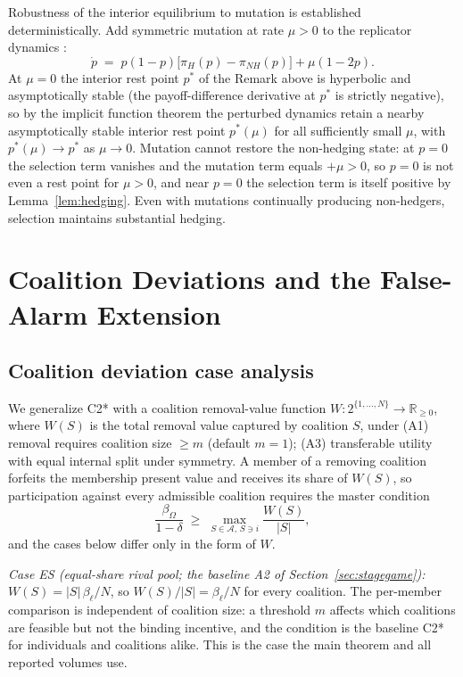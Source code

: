 \documentclass[manuscript,screen,review]{jair}
\begin{document}
Robustness of the interior equilibrium to mutation is established deterministically. Add symmetric mutation at rate $\mu > 0$ to the replicator dynamics \cite{nowak.2006,sandholm.2010}:
\begin{equation*}
\dot p \;=\; p(1-p)\bigl[\pi_H(p)-\pi_{NH}(p)\bigr] + \mu(1-2p).
\end{equation*}
At $\mu = 0$ the interior rest point $p^*$ of the Remark above is hyperbolic and asymptotically stable (the payoff-difference derivative at $p^*$ is strictly negative), so by the implicit function theorem the perturbed dynamics retain a nearby asymptotically stable interior rest point $p^*(\mu)$ for all sufficiently small $\mu$, with $p^*(\mu) \to p^*$ as $\mu \to 0$. Mutation cannot restore the non-hedging state: at $p = 0$ the selection term vanishes and the mutation term equals $+\mu > 0$, so $p = 0$ is not even a rest point for $\mu > 0$, and near $p = 0$ the selection term is itself positive by Lemma~\ref{lem:hedging}. Even with mutations continually producing non-hedgers, selection maintains substantial hedging.

\section{Coalition Deviations and the False-Alarm Extension}
\label{app:coalitions}

\subsection{Coalition deviation case analysis}
We generalize C2* with a coalition removal-value function $W: 2^{\{1,\ldots,N\}} \to \mathbb{R}_{\geq 0}$, where $W(S)$ is the total removal value captured by coalition $S$, under (A1) removal requires coalition size $\geq m$ (default $m = 1$); (A3) transferable utility with equal internal split under symmetry. A member of a removing coalition forfeits the membership present value and receives its share of $W(S)$, so participation against every admissible coalition requires the master condition
\begin{equation*}
\frac{\beta_\Omega}{1-\delta} \;\geq\; \max_{S \in \mathcal{A},\, S \ni i} \frac{W(S)}{|S|},
\end{equation*}
and the cases below differ only in the form of $W$.

\emph{Case ES (equal-share rival pool; the baseline A2 of Section~\ref{sec:stagegame}):} $W(S) = |S|\,\beta_\ell/N$, so $W(S)/|S| = \beta_\ell/N$ for every coalition. The per-member comparison is independent of coalition size: a threshold $m$ affects which coalitions are feasible but not the binding incentive, and the condition is the baseline C2* for individuals and coalitions alike. This is the case the main theorem and all reported volumes use.
\end{document}
